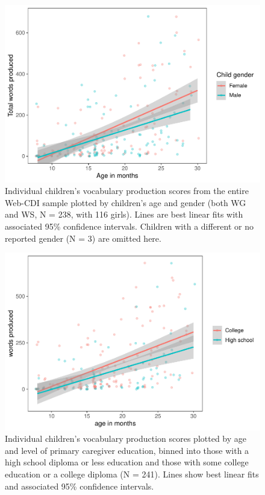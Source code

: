 \documentclass[
  english,
  man]{apa7}
\begin{document}
\begin{figure}
\centering
\includegraphics{webcdi_paper_files/figure-latex/genderses-1.pdf}
\caption{\label{fig:genderses}Individual children's vocabulary production scores from the entire Web-CDI sample plotted by children's age and gender (both WG and WS, N = 238, with 116 girls). Lines are best linear fits with associated 95\% confidence intervals. Children with a different or no reported gender (N = 3) are omitted here.}
\end{figure}

\begin{figure}
\centering
\includegraphics{webcdi_paper_files/figure-latex/momedses-1.pdf}
\caption{\label{fig:momedses}Individual children's vocabulary production scores plotted by age and level of primary caregiver education, binned into those with a high school diploma or less education and those with some college education or a college diploma (N = 241). Lines show best linear fits and associated 95\% confidence intervals.}
\end{figure}
\end{document}
